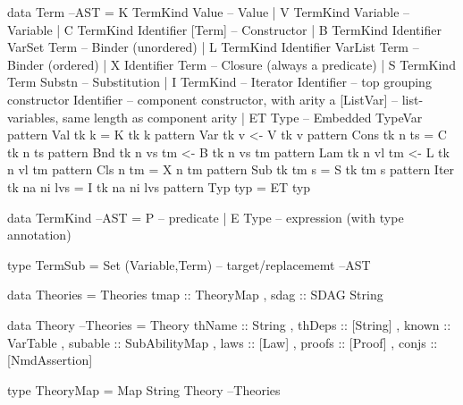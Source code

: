 \begin{code}
data Term                                                                --AST
 = K TermKind Value                    -- Value
 | V TermKind Variable                 -- Variable
 | C TermKind Identifier [Term]        -- Constructor
 | B TermKind Identifier VarSet Term   -- Binder (unordered)
 | L TermKind Identifier VarList Term  -- Binder (ordered)
 | X Identifier Term                   -- Closure (always a predicate)
 | S TermKind Term Substn              -- Substitution
 | I TermKind                          -- Iterator
     Identifier  -- top grouping constructor
     Identifier  -- component constructor, with arity a
     [ListVar]   -- list-variables, same length as component arity
 | ET Type                              -- Embedded TypeVar
pattern Val  tk k          =   K tk k
pattern Var  tk v          <-  V tk v
pattern Cons tk n ts       =   C tk n ts
pattern Bnd  tk n vs tm    <-  B tk n vs tm
pattern Lam  tk n vl tm    <-  L tk n vl tm
pattern Cls     n    tm    =   X n tm
pattern Sub  tk tm s       =   S tk tm s
pattern Iter tk na ni lvs  =   I tk na ni lvs
pattern Typ  typ           =   ET typ
\end{code}

\begin{code}
data TermKind                                                            --AST
 = P -- predicate
 | E Type -- expression (with type annotation)
\end{code}

\begin{code}
type TermSub = Set (Variable,Term) -- target/replacememt                --AST
\end{code}

\begin{code}
data Theories
  = Theories { tmap :: TheoryMap
             , sdag :: SDAG String }
\end{code}

\begin{code}
data Theory                                                         --Theories
  = Theory {
      thName   :: String
    , thDeps   :: [String]
    , known    :: VarTable
    , subable  :: SubAbilityMap
    , laws     :: [Law]
    , proofs   :: [Proof]
    , conjs    :: [NmdAssertion]
    }
\end{code}

\begin{code}
type TheoryMap = Map String Theory                                  --Theories
\end{code}

